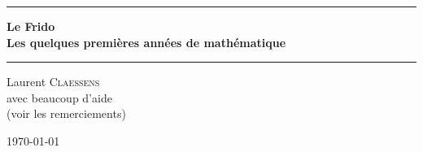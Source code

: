 

\thispagestyle{empty}
\begin{center}
	\begin{minipage}{15cm}
		\hrule\par
		\vspace{2mm}
		\begin{center}
			\Huge \bfseries Le Frido \\  {\small Les quelques premières années de mathématique}
			\normalsize
		\end{center}
		\hrule\par
	\end{minipage}
\end{center}

\vspace{2cm}

\begin{center}
	Laurent \textsc{Claessens} \\
	\vspace{0.5cm}
	avec beaucoup d'aide \\
	(voir les remerciements)

	\vspace{1cm}

	\today\\
	\texttt{\GitCommitHexsha}


\end{center}

\vfill

\LogoEtLicence

\newpage


